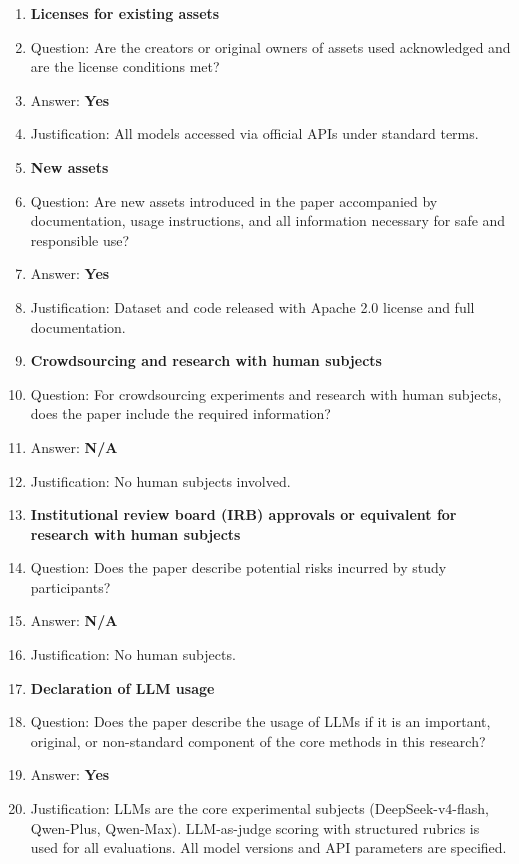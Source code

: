 \documentclass{article}
\newcommand{\answerYes}[1][]{\textbf{Yes}}
\newcommand{\answerNA}[1][]{\textbf{N/A}}
\begin{document}
\begin{enumerate}
\item {\bf Licenses for existing assets}
    \item[] Question: Are the creators or original owners of assets used acknowledged and are the license conditions met?
    \item[] Answer: \answerYes{}
    \item[] Justification: All models accessed via official APIs under standard terms.

\item {\bf New assets}
    \item[] Question: Are new assets introduced in the paper accompanied by documentation, usage instructions, and all information necessary for safe and responsible use?
    \item[] Answer: \answerYes{}
    \item[] Justification: Dataset and code released with Apache 2.0 license and full documentation.

\item {\bf Crowdsourcing and research with human subjects}
    \item[] Question: For crowdsourcing experiments and research with human subjects, does the paper include the required information?
    \item[] Answer: \answerNA{}
    \item[] Justification: No human subjects involved.

\item {\bf Institutional review board (IRB) approvals or equivalent for research with human subjects}
    \item[] Question: Does the paper describe potential risks incurred by study participants?
    \item[] Answer: \answerNA{}
    \item[] Justification: No human subjects.

\item {\bf Declaration of LLM usage}
    \item[] Question: Does the paper describe the usage of LLMs if it is an important, original, or non-standard component of the core methods in this research?
    \item[] Answer: \answerYes{}
    \item[] Justification: LLMs are the core experimental subjects (DeepSeek-v4-flash, Qwen-Plus, Qwen-Max). LLM-as-judge scoring with structured rubrics is used for all evaluations. All model versions and API parameters are specified.

\end{enumerate}
\end{document}
